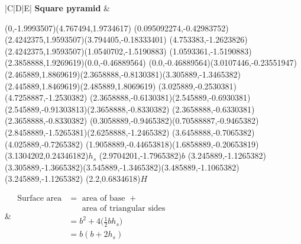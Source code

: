 \begin{table}[H]
\begin{tabular}{|C|D|E|}
\hline
\textbf{Square pyramid}
&
\begin{center}

\scalebox{0.7} %
{
\begin{pspicture}(0,-1.9993507)(4.767494,1.9734617)
\pspolygon[linewidth=0.028222222,fillstyle=solid](0.095092274,-0.42983752)(2.4242375,1.9593507)(3.794405,-0.18333401)
\pspolygon[linewidth=0.028222222,fillstyle=solid](4.753383,-1.2623826)(2.4242375,1.9593507)(1.0540702,-1.5190883)
\pspolygon[linewidth=0.028222222,fillstyle=solid](1.0593361,-1.5190883)(2.3858888,1.9269619)(0.0,-0.46889564)
\psline[linewidth=0.022cm,linestyle=dashed,dash=0.16cm 0.16cm](0.0,-0.46889564)(3.0107446,-0.23551947)
\psline[linewidth=0.027999999,linestyle=dotted,dotsep=0.16cm](2.465889,1.8869619)(2.3658888,-0.8130381)(3.305889,-1.3465382)(2.445889,1.8469619)(2.485889,1.8069619)
\psline[linewidth=0.024cm,linestyle=dashed,dash=0.16cm 0.16cm](3.025889,-0.2530381)(4.7258887,-1.2530382)
\psline[linewidth=0.02](2.3658888,-0.6130381)(2.545889,-0.6930381)(2.545889,-0.91303813)(2.3658888,-0.8330382)
\psline[linewidth=0.02cm](2.3658888,-0.6330381)(2.3658888,-0.8330382)
\psline[linewidth=0.04cm](0.3058889,-0.9465382)(0.70588887,-0.9465382)
\psline[linewidth=0.04cm](2.8458889,-1.5265381)(2.6258888,-1.2465382)
\psline[linewidth=0.04cm](3.6458888,-0.7065382)(4.025889,-0.7265382)
\psline[linewidth=0.04cm](1.9058889,-0.44653818)(1.6858889,-0.20653819)
\rput(3.1304202,0.24346182){$h_s$}
\rput(2.9704201,-1.7965382){$b$}
\psline[linewidth=0.02](3.245889,-1.1265382)(3.305889,-1.3665382)(3.545889,-1.3465382)(3.485889,-1.1065382)(3.245889,-1.1265382)
\rput(2.2,0.6834618){$H$}
\end{pspicture} 
}
\end{center} 
&
$\begin{aligned}
\mbox{Surface area} &= \mbox{ area of base } +\\
&~~~~~~\mbox{ area of triangular sides } \\
&=b^{2} + 4\Big(\frac{1}{2}bh_s\Big)\\
&=b(b+2h_s)
 \end{aligned}$
\\ \hline


\end{tabular}
\end{table}
